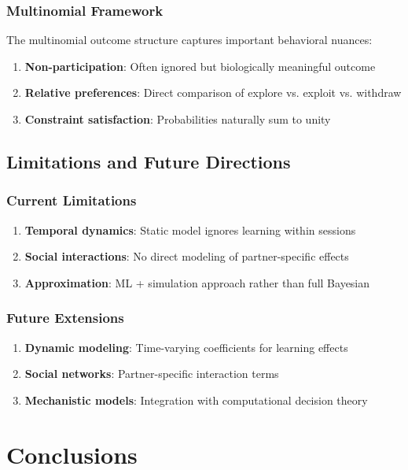\documentclass[11pt]{article}
\begin{document}
\subsubsection{Multinomial Framework}
The multinomial outcome structure captures important behavioral nuances:
\begin{enumerate}
    \item \textbf{Non-participation}: Often ignored but biologically meaningful outcome
    \item \textbf{Relative preferences}: Direct comparison of explore vs. exploit vs. withdraw
    \item \textbf{Constraint satisfaction}: Probabilities naturally sum to unity
\end{enumerate}

\subsection{Limitations and Future Directions}

\subsubsection{Current Limitations}
\begin{enumerate}
    \item \textbf{Temporal dynamics}: Static model ignores learning within sessions
    \item \textbf{Social interactions}: No direct modeling of partner-specific effects
    \item \textbf{Approximation}: ML + simulation approach rather than full Bayesian
\end{enumerate}

\subsubsection{Future Extensions}
\begin{enumerate}
    \item \textbf{Dynamic modeling}: Time-varying coefficients for learning effects
    \item \textbf{Social networks}: Partner-specific interaction terms
    \item \textbf{Mechanistic models}: Integration with computational decision theory
\end{enumerate}

\section{Conclusions}
\end{document}
